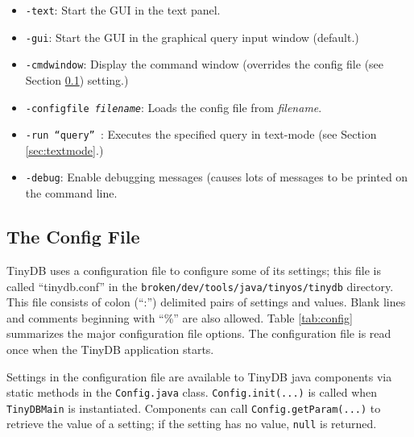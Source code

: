 \documentclass[11pt]{article}
\newcommand{\java}{broken/dev/tools/java}
\begin{document}
\begin{itemize}
\item {\tt -text}: Start the GUI in the text panel.
\item {\tt -gui}: Start the GUI in the graphical query input window (default.)
\item {\tt -cmdwindow}: Display the command window (overrides the config file (see Section \ref{sec:configfile}) setting.)
\item {\tt -configfile {\it filename}}: Loads the config file from {\it filename}.
\item {\tt -run ``{\it query}'' }: Executes the specified query in text-mode (see Section \ref{sec:textmode}.)
\item {\tt -debug}: Enable debugging messages (causes lots of messages to be printed on the command line.
\end{itemize}

\subsection{The Config File}\label{sec:configfile}

TinyDB uses a configuration file to configure some of its settings;  
this file is called ``tinydb.conf'' in the {\tt \java/tinyos/tinydb}
directory.  This file consists of colon (``:'') delimited pairs of settings and values.
Blank lines and comments beginning with ``\%'' are also allowed.  Table \ref{tab:config}
summarizes the major configuration file options.  The configuration file
is read once when the TinyDB application starts.

Settings in the configuration file are available to TinyDB java components via static
methods in the {\tt Config.java} class.  {\tt Config.init(...)} is called when {\tt TinyDBMain}
is instantiated.  Components can call {\tt Config.getParam(...)} to retrieve the value
of a setting;  if the setting has no value, {\tt null} is returned.
\end{document}
